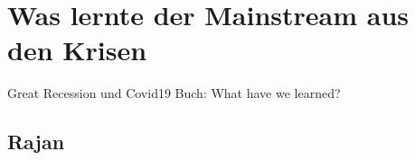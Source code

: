 %
%
%

\chapter{Was lernte der Mainstream aus den Krisen}
\label{Krise}

Great Recession
und Covid19
Buch: What have we learned?
\section{Rajan}


